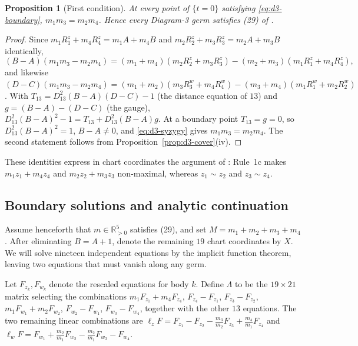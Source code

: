 \documentclass[Threeside,11pt]{article}
\newtheorem{proposition}[theorem]{Proposition}
\theoremstyle{definition}
\theoremstyle{remark}
\numberwithin{equation}{section}
\theoremstyle{remark}
\newcommand{\Rp}{\mathbb{R}_{>0}}
\begin{document}
\begin{proposition}[First condition]\label{prop:d3-first}
At every point of $\{t=0\}$ satisfying \eqref{eq:d3-boundary}, $m_1m_3=m_2m_4$.  Hence every
Diagram-3 germ satisfies (29) of \cite[\S8.3]{AK}.
\end{proposition}

\begin{proof}
Since $m_1R^z_1+m_4R^z_4=m_1A+m_4B$ and $m_2R^z_2+m_3R^z_3=m_2A+m_3B$ identically,
\begin{equation}\label{eq:d3-syzygy}
(B-A)(m_1m_3-m_2m_4)=(m_1+m_4)(m_2R^z_2+m_3R^z_3)-(m_2+m_3)(m_1R^z_1+m_4R^z_4),
\end{equation}
and likewise
$(D-C)(m_1m_3-m_2m_4)=(m_1+m_2)(m_3R^w_3+m_4R^w_4)-(m_3+m_4)(m_1R^w_1+m_2R^w_2)$.  With
$T_{13}=D_{13}^2(B-A)(D-C)-1$ (the distance equation of $13$) and $g=(B-A)-(D-C)$ (the gauge),
$D_{13}^2(B-A)^2-1=T_{13}+D_{13}^2(B-A)g$.  At a boundary point $T_{13}=g=0$, so
$D_{13}^2(B-A)^2=1$, $B-A\ne0$, and \eqref{eq:d3-syzygy} gives $m_1m_3=m_2m_4$.  The second
statement follows from Proposition~\ref{prop:d3-cover}(iv).
\end{proof}

{These identities express in chart coordinates the argument of \cite[\S5.2]{AK}:
Rule~1c makes $m_1z_1+m_4z_4$ and $m_2z_2+m_3z_3$ non-maximal, whereas
$z_1\sim z_2$ and $z_3\sim z_4$.}

\subsection{Boundary solutions and analytic continuation}
{Assume henceforth that $m\in\Rp^5$ satisfies (29), and set
$M=m_1+m_2+m_3+m_4$. After eliminating $B=A+1$, denote the remaining $19$ chart coordinates
by $X$. We will solve nineteen independent equations by the implicit function theorem,
leaving two equations that must vanish along any germ.

Let $F_{z_k},F_{w_k}$ denote the rescaled equations for body $k$.
Define $\Lambda$ to be the $19\times21$ matrix selecting the combinations
$m_1F_{z_1}+m_4F_{z_4}$, $F_{z_4}-F_{z_1}$, $F_{z_3}-F_{z_2}$,
$m_1F_{w_1}+m_2F_{w_2}$, $F_{w_2}-F_{w_1}$, $F_{w_3}-F_{w_4}$,
together with the other $13$ equations. The two remaining linear combinations are
$\ell_zF=F_{z_1}-F_{z_2}-\frac{m_3}{m_2}F_{z_3}+\frac{m_4}{m_1}F_{z_4}$ and
$\ell_wF=F_{w_1}+\frac{m_2}{m_1}F_{w_2}-\frac{m_2}{m_1}F_{w_3}-F_{w_4}$.}
\end{document}
